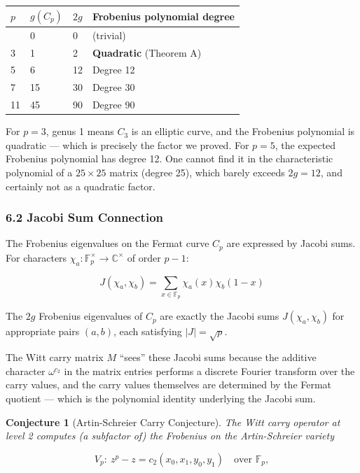 \documentclass[
  11pt,
]{article}
\begin{document}
\begin{longtable}[]{@{}llll@{}}
\toprule\noalign{}
\(p\) & \(g(C_p)\) & \(2g\) & Frobenius polynomial degree \\
\midrule\noalign{}
\endhead
\bottomrule\noalign{}
\endlastfoot
2 & 0 & 0 & (trivial) \\
3 & 1 & 2 & \textbf{Quadratic} (Theorem A) \\
5 & 6 & 12 & Degree 12 \\
7 & 15 & 30 & Degree 30 \\
11 & 45 & 90 & Degree 90 \\
\end{longtable}

For \(p = 3\), genus 1 means \(C_3\) is an elliptic curve, and the Frobenius
polynomial is quadratic --- which is precisely the factor we proved. For
\(p = 5\), the expected Frobenius polynomial has degree 12. One cannot find it
in the characteristic polynomial of a \(25 \times 25\) matrix (degree 25), which
barely exceeds \(2g = 12\), and certainly not as a quadratic factor.

\subsubsection{6.2 Jacobi Sum Connection}\label{jacobi-sum-connection}

The Frobenius eigenvalues on the Fermat curve \(C_p\) are expressed by Jacobi
sums. For characters \(\chi_a: \mathbb{F}_p^\times \to \mathbb{C}^\times\) of
order \(p-1\):

\[J(\chi_a, \chi_b) = \sum_{x \in \mathbb{F}_p} \chi_a(x) \chi_b(1-x)\]

The \(2g\) Frobenius eigenvalues of \(C_p\) are exactly the Jacobi sums
\(J(\chi_a, \chi_b)\) for appropriate pairs \((a, b)\), each satisfying
\(\lvert J\rvert = \sqrt{p}\).

The Witt carry matrix \(M\) ``sees'' these Jacobi sums because the additive
character \(\omega^{c_2}\) in the matrix entries performs a discrete Fourier
transform over the carry values, and the carry values themselves are determined
by the Fermat quotient --- which is the polynomial identity underlying the
Jacobi sum.

\textbf{Conjecture 1} (Artin-Schreier Carry Conjecture). \emph{The Witt carry
operator at level 2 computes (a subfactor of) the Frobenius on the
Artin-Schreier variety}

\[V_p:\ z^p - z = c_2(x_0, x_1, y_0, y_1) \quad \text{over } \mathbb{F}_p,\]
\end{document}
